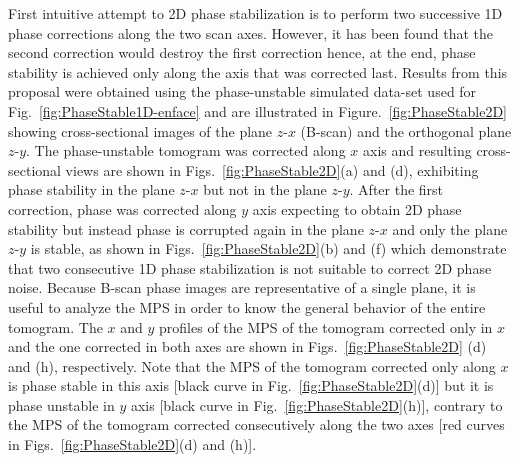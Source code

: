 First intuitive attempt to 2D phase stabilization is to perform two successive 1D phase corrections along the two scan axes. However, it has been found that the second correction would destroy the first correction hence, at the end, phase stability is achieved only along the axis that was corrected last. Results from this proposal were obtained using the phase-unstable simulated data-set used for Fig.~\ref{fig:PhaseStable1D-enface} and are illustrated in Figure.~\ref{fig:PhaseStable2D} showing cross-sectional images of the plane $z$-$x$ (B-scan) and the orthogonal plane $z$-$y$. The phase-unstable tomogram was corrected along $x$ axis and resulting cross-sectional views are shown in Figs.~\ref{fig:PhaseStable2D}(a) and (d), exhibiting phase stability in the plane $z$-$x$ but not in the plane $z$-$y$. After the first correction, phase was corrected along $y$ axis expecting to obtain 2D phase stability but instead phase is corrupted again in the plane $z$-$x$ and only the plane $z$-$y$ is stable, as shown in Figs.~\ref{fig:PhaseStable2D}(b) and (f) which demonstrate that two consecutive 1D phase stabilization is not suitable to correct 2D phase noise. Because B-scan phase images are representative of a single plane, it is useful to analyze the MPS in order to know the general behavior of the entire tomogram. The $x$ and $y$ profiles of the MPS of the tomogram corrected only in $x$ and the one corrected in both axes are shown in Figs.~\ref{fig:PhaseStable2D} (d) and (h), respectively. Note that the MPS of the tomogram corrected only along $x$ is phase stable in this axis [black curve in Fig.~\ref{fig:PhaseStable2D}(d)] but it is phase unstable in $y$ axis [black curve in Fig.~\ref{fig:PhaseStable2D}(h)], contrary to the MPS of the tomogram corrected consecutively along the two axes [red curves in Figs.~\ref{fig:PhaseStable2D}(d) and (h)].


